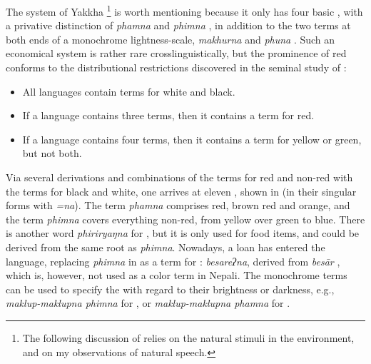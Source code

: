 The system of Yakkha \footnote{The following discussion of  relies on the natural stimuli in the environment, and on my observations of natural speech.} is worth mentioning because it only has four basic , with a privative distinction of \emph{phamna}  and \emph{phimna} , in addition to the two terms at both ends of a monochrome lightness-scale, \emph{makhurna}  and \emph{phuna} . Such an economical system is rather rare crosslinguistically, but the prominence of red conforms to the distributional restrictions discovered in the seminal study of \citet[2--3]{Berlinetal1969Basic}: 

\begin{itemize}
\item All languages contain terms for white and black.
\item If a language contains three terms, then it contains a term for red. 
\item If a language contains four terms, then it contains a term for yellow or green, but not both.
\end{itemize}

Via several derivations and combinations of the terms for red and non-red with the terms for black and white, one arrives at eleven , shown in  (in their singular forms with \emph{=na}). The term \emph{phamna} comprises  red, brown red and orange, and the term \emph{phimna} covers everything non-red, from yellow over green to blue. There is another word \emph{phiriryaŋna} for , but it is only used for food items, and could be derived from the same root as \emph{phimna}. Nowadays, a  loan has entered the language, replacing \emph{phimna} in as a term for : \emph{besareʔna}, derived from  \emph{besār} , which is, however, not used as a color term in Nepali.  The monochrome terms can be used to specify the  with regard to their brightness or darkness, e.g., \emph{maklup-maklupna phimna} for , or \emph{maklup-maklupna phamna} for . 



